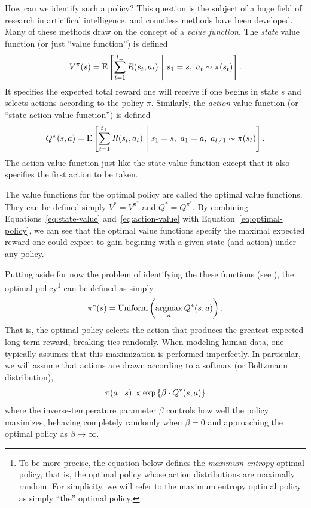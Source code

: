 How can we identify such a policy? This question is the subject of a huge field of research in articifical intelligence, and countless methods have been developed. Many of these methods draw on the concept of a \emph{value function}. The \emph{state} value function (or just ``value function'') is defined
%
\begin{equation}\label{eq:state-value}
  V^\pi(s) = \operatorname*{E} \left[ 
    \sum_{t=1}^{t_\bot} R(s_t, a_t)
   \ \middle\vert\ 
   s_1 = s,\ a_t \sim \pi(s_t)
   \right].
\end{equation}
%
It specifies the expected total reward one will receive if one begins in state $s$ and selects actions according to the policy $\pi$. Similarly, the \emph{action} value function (or ``state-action value function'') is defined
%
\begin{equation}\label{eq:action-value}
  Q^\pi(s, a) = \operatorname*{E} \left[ 
    \sum_{t=1}^{t_\bot} R(s_t, a_t)
   \ \middle\vert\ 
   s_1 = s,\ a_1 = a,\ a_{t \neq 1} \sim \pi(s_t)
   \right].
\end{equation}
%
The action value function just like the state value function except that it also specifies the first action to be taken. 

The value functions for the optimal policy are called the optimal value functions. They can be defined simply $V^* = V^{\pi^*}$ and $Q^* = Q^{\pi^*}$. By combining Equations~\ref{eq:state-value} and~\ref{eq:action-value} with Equation~\ref{eq:optimal-policy}, we can see that the optimal value functions specify the maximal expected reward one could expect to gain begining with a given state (and action) under any policy.

Putting aside for now the problem of identifying the these functions (see \citealp{puterman2014markov}), the optimal policy\footnote{%
  To be more precise, the equation below defines the \emph{maximum entropy} optimal policy, that is, the optimal policy whose action distributions are maximally random. For simplicity, we will refer to the maximum entropy optimal policy as simply ``the'' optimal policy.
} can be defined as simply
%
\begin{equation}\label{eq:argmaxQ}
  \pi^*(s) = \text{Uniform}\left(\operatorname*{argmax}_a Q^*(s, a)\right).
\end{equation}
%
That is, the optimal policy selects the action that produces the greatest expected long-term reward, breaking ties randomly. When modeling human data, one typically assumes that this maximization is performed imperfectly. In particular, we will assume that actions are drawn according to a softmax (or Boltzmann distribution),
%
\begin{equation}\label{eq:softoptimal}
  \pi(a \mid s) \propto \exp\left\{\beta \cdot Q^*(s, a)\right\}
\end{equation}
%
where the inverse-temperature parameter $\beta$ controls how well the policy maximizes, behaving completely randomly when $\beta = 0$ and approaching the optimal policy as $\beta \rightarrow \infty$.

